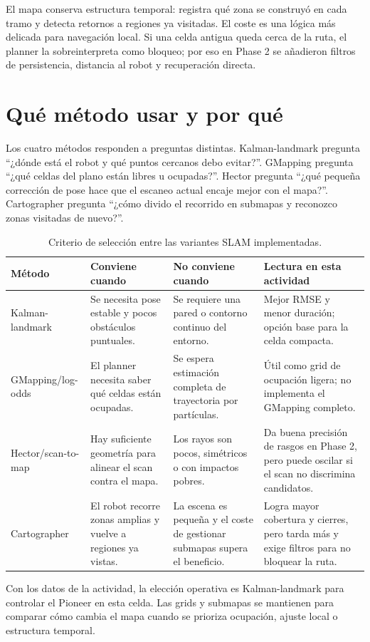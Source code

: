 El mapa conserva estructura temporal: registra qué zona
se construyó en cada tramo y detecta retornos a regiones ya visitadas. El coste
es una lógica más delicada para navegación local. Si una celda antigua queda
cerca de la ruta, el planner la sobreinterpreta como bloqueo; por eso en
Phase 2 se añadieron filtros de persistencia, distancia al robot y recuperación
directa.

\section{Qué método usar y por qué}

Los cuatro métodos responden a preguntas distintas. Kalman-landmark pregunta
``¿dónde está el robot y qué puntos cercanos debo evitar?''. GMapping pregunta
``¿qué celdas del plano están libres u ocupadas?''. Hector pregunta ``¿qué
pequeña corrección de pose hace que el escaneo actual encaje mejor con el mapa?''.
Cartographer pregunta ``¿cómo divido el recorrido en submapas y reconozco zonas
visitadas de nuevo?''.

\begin{table}[H]
\centering
\small
\setlength{\tabcolsep}{3pt}
\begin{tabularx}{\textwidth}{@{}P{0.20\textwidth}P{0.28\textwidth}P{0.25\textwidth}Y@{}}
\toprule
\textbf{Método} & \textbf{Conviene cuando} & \textbf{No conviene cuando} & \textbf{Lectura en esta actividad}\\
\midrule
Kalman-landmark & Se necesita pose estable y pocos obstáculos puntuales. & Se requiere una pared o contorno continuo del entorno. & Mejor RMSE y menor duración; opción base para la celda compacta.\\
GMapping/log-odds & El planner necesita saber qué celdas están ocupadas. & Se espera estimación completa de trayectoria por partículas. & Útil como grid de ocupación ligera; no implementa el GMapping completo.\\
Hector/scan-to-map & Hay suficiente geometría para alinear el scan contra el mapa. & Los rayos son pocos, simétricos o con impactos pobres. & Da buena precisión de rasgos en Phase 2, pero puede oscilar si el scan no discrimina candidatos.\\
Cartographer & El robot recorre zonas amplias y vuelve a regiones ya vistas. & La escena es pequeña y el coste de gestionar submapas supera el beneficio. & Logra mayor cobertura y cierres, pero tarda más y exige filtros para no bloquear la ruta.\\
\bottomrule
\end{tabularx}
\caption{Criterio de selección entre las variantes SLAM implementadas.}
\label{tab:slam-selection}
\end{table}

Con los datos de la actividad, la elección operativa es Kalman-landmark para
controlar el Pioneer en esta celda. Las grids y submapas se mantienen para
comparar cómo cambia el mapa cuando se prioriza ocupación, ajuste local o
estructura temporal.
